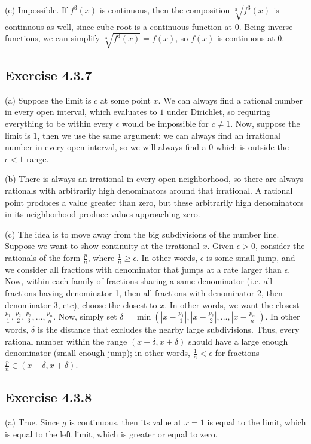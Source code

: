 \documentclass{book}
\begin{document}
\noindent
(e)
Impossible. If $f^3(x)$ is continuous, then the composition $\sqrt[3]{f^3(x)}$ is continuous as well, since cube root is a continuous function at $0$. Being inverse functions, we can simplify $\sqrt[3]{f^3(x)} = f(x)$, so $f(x)$ is continuous at $0$.

\subsection*{Exercise 4.3.7}
(a)
Suppose the limit is $c$ at some point $x$. We can always find a rational number in every open interval, which evaluates to $1$ under Dirichlet, so requiring everything to be within every $\epsilon$ would be impossible for $c \neq 1$. Now, suppose the limit is $1$, then we use the same argument: we can always find an irrational number in every open interval, so we will always find a $0$ which is outside the $\epsilon < 1$ range.

\noindent
(b)
There is always an irrational in every open neighborhood, so there are always rationals with arbitrarily high denominators around that irrational. A rational point produces a value greater than zero, but these arbitrarily high denominators in its neighborhood produce values approaching zero.

\noindent
(c)
The idea is to move away from the big subdivisions of the number line. Suppose we want to show continuity at the irrational $x$. Given $\epsilon > 0$, consider the rationals of the form $\frac{p}{n}$, where $\frac{1}{n} \geq \epsilon$. In other words, $\epsilon$ is some small jump, and we consider all fractions with denominator that jumps at a rate larger than $\epsilon$. Now, within each family of fractions sharing a same denominator (i.e. all fractions having denominator 1, then all fractions with denominator 2, then denominator 3, etc), choose the closest to $x$. In other words, we want the closest $\frac{p_1}{1}, \frac{p_2}{2}, \frac{p_3}{3}, \ldots, \frac{p_n}{n}$. Now, simply set $\delta = \min (|x - \frac{p_1}{1}|, |x - \frac{p_2}{2}|, \ldots, |x - \frac{p_n}{n}|)$. In other words, $\delta$ is the distance that excludes the nearby large subdivisions. Thus, every rational number within the range $(x - \delta, x + \delta)$ should have a large enough denominator (small enough jump); in other words, $\frac{1}{n} < \epsilon$ for fractions $\frac{p}{n} \in (x - \delta, x + \delta)$.

\subsection*{Exercise 4.3.8}
(a)
True. Since $g$ is continuous, then its value at $x = 1$ is equal to the limit, which is equal to the left limit, which is greater or equal to zero.
\end{document}
